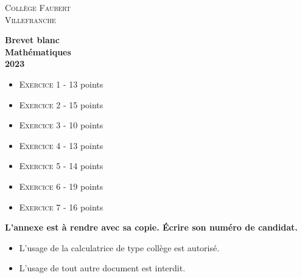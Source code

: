 




\begin{titlepage}

\center %

\textsc{\LARGE Collège Faubert}\\[2cm] %
\textsc{\large Villefranche}\\[2cm] %

\horrule{2px}

\vspace{1cm}

{ \Huge \bfseries Brevet blanc}\\[2cm] %
{ \Huge \bfseries Mathématiques}\\[2cm] %
{\large \bfseries 2023}\\[2cm] 

\horrule{2px}

\vspace{1cm}

\begin{itemize}[label={$\bullet$}]
  \item \textsc{Exercice 1} - 13 points     
  \item \textsc{Exercice 2} - 15 points 
  \item \textsc{Exercice 3} - 10 points 
  \item \textsc{Exercice 4} - 13 points 
  \item \textsc{Exercice 5} - 14 points 
  \item \textsc{Exercice 6} - 19 points 
  \item \textsc{Exercice 7} - 16 points 
\end{itemize}

\vspace{1cm}

\horrule{2px}

\vspace{1cm}

\textbf{L'annexe est à rendre avec sa copie. Écrire son numéro de candidat.}

\vspace{1cm}

\begin{itemize}
  \item L'usage de la calculatrice de type collège est autorisé.
  \item L'usage de tout autre document est interdit. 
\end{itemize}

\vfill 

\end{titlepage}


